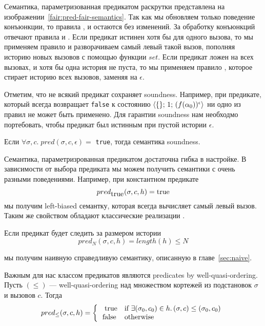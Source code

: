 Семантика, параметризованная предикатом раскрутки представлена на изображении~\ref{fair:pred-fair-semantics}. Так как мы обновляем только поведение конъюнкции, то правила ,  и  остаются без изменений. За обработку конъюнкций отвечают правила  и . Если предикат истинен хотя бы для одного вызова, то мы применяем правило и разворачиваем самый левый такой вызов, пополняя историю новых вызовов с помощью функции $set$. Если предикат ложен на всех вызовах, и хотя бы одна история не пуста, то мы применяем правило , которое стирает историю всех вызовов, заменяя на $\epsilon$.

Отметим, что не всякий предикат сохраняет soundness. Например, при предикате, который всегда возвращает \lstinline{false} к состоянию $\langle \{\};\, 1; \, (f(\alpha_0))^\epsilon \rangle$ ни одно из правил не может быть применено. Для гарантии soundness нам необходмо портебовать, чтобы предикат был истинным при пустой истории $\epsilon$.

\begin{lemma}
 Если $\forall \sigma, c. \; pred(\sigma, c, \epsilon) =$ \lstinline{true}, тогда семантика soundness.
\end{lemma}

Семантика, параметризрованная предикатом достаточна гибка в настройке. В зависимости от выбора предиката мы можем получить семантики с очень разными поведениями. Например, при константном предикате
\[
pred_{\mbox{\lstinline{true}}}(\sigma, c, h) = \mbox{\lstinline{true}} 
\]
\noindent мы получим left-biased семантку, которая всегда вычисляет самый левый вызов. Таким же свойством обладают классические реализации \mk.

Если предикат будет следить за размером истории
\[
pred_N(\sigma, c, h) =  length(h) \leq N
\]

\noindent мы получим наивную справедливую семантику, описанную в главе~\ref{sec:naive}.

Важным для нас классом предикатов являются predicates by well-quasi-ordering. Пусть $(\leq)$ --- well-quasi-ordering над множеством кортежей из подстановок $\sigma$ и вызовов $c$. Тогда
\[
pred_\leq(\sigma, c, h) = \left\{
\begin{array}{rl}
\mbox{\lstinline{true}}  & \mbox{if } \exists (\sigma_0, c_0) \in h. \, (\sigma, c) \leq (\sigma_0, c_0) \\
\mbox{\lstinline{false}} & \mbox{otherwise}
\end{array}
\right.
\]

